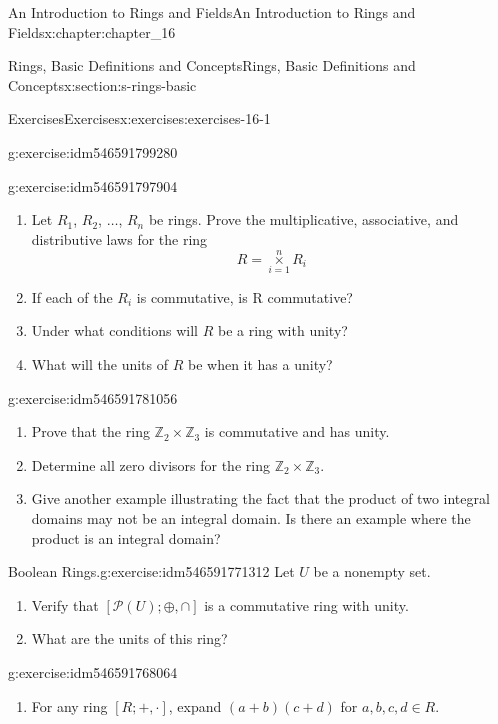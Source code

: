 \documentclass[oneside,10pt,]{book}
\numberwithin{equation}{section}
\begin{document}
\begin{chapterptx}{An Introduction to Rings and Fields}{}{An Introduction to Rings and Fields}{}{}{x:chapter:chapter_16}
\begin{sectionptx}{Rings, Basic Definitions and Concepts}{}{Rings, Basic Definitions and Concepts}{}{}{x:section:s-rings-basic}
\begin{exercises-subsection}{Exercises}{}{Exercises}{}{}{x:exercises:exercises-16-1}
\begin{divisionexercise}{9}{}{}{g:exercise:idm546591799280}
\end{divisionexercise}%
\begin{divisionexercise}{10}{}{}{g:exercise:idm546591797904}%
%
\begin{enumerate}[label=(\alph*)]
\item{}Let \(R_1\), \(R_2\), \(\ldots\), \(R_n\) be rings. Prove the multiplicative, associative, and distributive laws for the ring%
\begin{equation*}
R=\underset{i=1}{\overset{n}{\times }}R_i
\end{equation*}
%
\item{}If each of the \(R_i\) is commutative, is R commutative?%
\item{}Under what conditions will \(R\) be a ring with unity?%
\item{}What will the units of \(R\) be when it has a unity?%
\end{enumerate}
%
\end{divisionexercise}%
\begin{divisionexercise}{11}{}{}{g:exercise:idm546591781056}%
%
\begin{enumerate}[label=(\alph*)]
\item{}Prove that the ring \(\mathbb{Z}_2 \times \mathbb{Z}_3\) is commutative and has unity.%
\item{}Determine all zero divisors for the ring \(\mathbb{Z}_2 \times \mathbb{Z}_3\).%
\item{}Give another example illustrating the fact that the product of two integral domains may not be an integral domain. Is there an example where the product is an integral domain?%
\end{enumerate}
%
\end{divisionexercise}%
\begin{divisionexercise}{12}{Boolean Rings.}{}{g:exercise:idm546591771312}%
Let \(U\) be a nonempty set.%
\begin{enumerate}[label=(\alph*)]
\item{}Verify that \([\mathcal{P}(U);\oplus ,\cap ]\) is a commutative ring with unity.%
\item{}What are the units of this ring?%
\end{enumerate}
%
\end{divisionexercise}%
\begin{divisionexercise}{13}{}{}{g:exercise:idm546591768064}%
%
\begin{enumerate}[label=(\alph*)]
\item{}For any ring \([R; +, \cdot ]\), expand \((a + b)(c + d)\) for \(a, b, c, d \in R\).%

\end{enumerate}
\end{divisionexercise}
\end{exercises-subsection}
\end{sectionptx}
\end{chapterptx}
\end{document}
